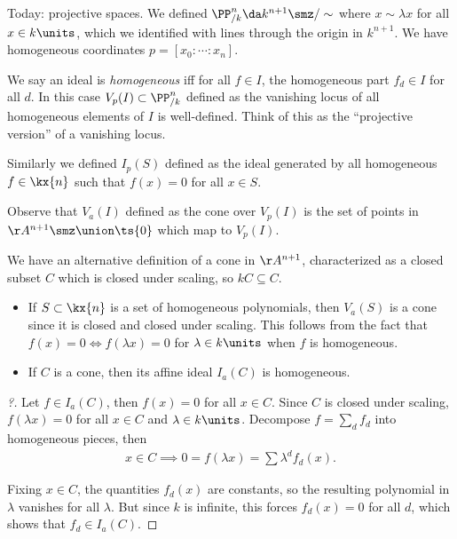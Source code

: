 Today: projective spaces. We defined
\(\PP^n_{/k} \da k^{n+1}\smz /\sim\) where \(x\sim \lambda x\) for all
\(x\in k\units\), which we identified with lines through the origin in
\(k^{n+1}\). We have homogeneous coordinates
\(p = [x_0: \cdots : x_n]\).

We say an ideal is \emph{homogeneous} iff for all \(f\in I\), the
homogeneous part \(f_d\in I\) for all \(d\). In this case
\(V_p(I) \subset \PP^{n}_{/k}\) defined as the vanishing locus of all
homogeneous elements of \(I\) is well-defined. Think of this as the
``projective version'' of a vanishing locus.

Similarly we defined \(I_p(S)\) defined as the ideal generated by all
homogeneous \(f\in \kx{n}\) such that \(f(x) = 0\) for all \(x\in S\).

\begin{remark}

Observe that \(V_a(I)\) defined as the cone over \(V_p(I)\) is the set
of points in \(\AA^{n+1}\smz \union \ts{0}\) which map to \(V_p(I)\).

\end{remark}

We have an alternative definition of a cone in \(\AA^{n+1}\),
characterized as a closed subset \(C\) which is closed under scaling, so
\(kC\subseteq C\).

\begin{proposition}

\envlist

\begin{itemize}
\item
  If \(S\subset \kx{n}\) is a set of homogeneous polynomials, then
  \(V_a(S)\) is a cone since it is closed and closed under scaling. This
  follows from the fact that \(f(x) = 0 \iff f(\lambda x) = 0\) for
  \(\lambda \in k\units\) when \(f\) is homogeneous.
\item
  If \(C\) is a cone, then its affine ideal \(I_a(C)\) is homogeneous.
\end{itemize}

\end{proposition}

\begin{proof}[?]

Let \(f\in I_a(C)\), then \(f(x) = 0\) for all \(x\in C\). Since \(C\)
is closed under scaling, \(f(\lambda x) = 0\) for all \(x\in C\) and
\(\lambda \in k\units\). Decompose \(f = \sum_d f_d\) into homogeneous
pieces, then
\begin{align*}  
x\in C \implies 0 = f(\lambda x) = \sum \lambda^d f_d(x) 
.\end{align*}

Fixing \(x\in C\), the quantities \(f_d(x)\) are constants, so the
resulting polynomial in \(\lambda\) vanishes for all \(\lambda\). But
since \(k\) is infinite, this forces \(f_d(x) = 0\) for all \(d\), which
shows that \(f_d \in I_a(C)\).

\end{proof}

